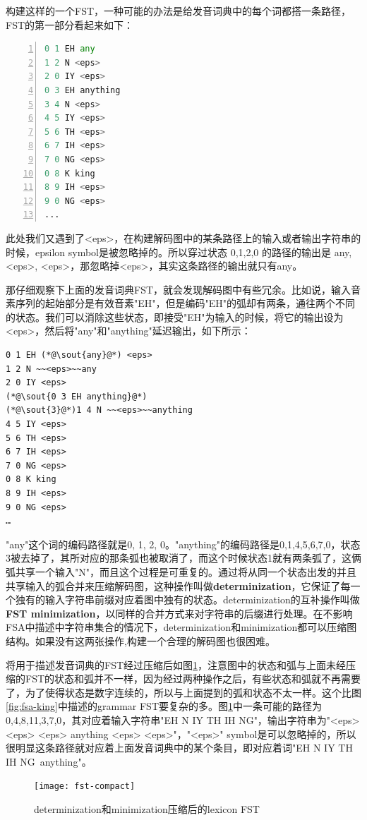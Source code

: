 构建这样的一个FST，一种可能的办法是给发音词典中的每个词都搭一条路径，FST的第一部分看起来如下：
\begin{lstlisting}[language = python, numbers=left, 
   numberstyle=\tiny,keywordstyle=\color{blue!70},
   commentstyle=\color{red!50!green!50!blue!50},frame=shadowbox,
   rulesepcolor=\color{red!20!green!20!blue!20},basicstyle=\ttfamily]
0 1 EH any
1 2 N <eps>
2 0 IY <eps>
0 3 EH anything
3 4 N <eps>
4 5 IY <eps>
5 6 TH <eps>
6 7 IH <eps>
7 0 NG <eps>
0 8 K king
8 9 IH <eps>
9 0 NG <eps>
...
\end{lstlisting}

此处我们又遇到了<eps>，在构建解码图中的某条路径上的输入或者输出字符串的时候，epsilon symbol是被忽略掉的。所以穿过状态 0,1,2,0 的路径的输出是 any, <eps>, <eps>，那忽略掉<eps>，其实这条路径的输出就只有any。

那仔细观察下上面的发音词典FST，就会发现解码图中有些冗余。比如说，输入音素序列的起始部分是有效音素"EH"，但是编码"EH"的弧却有两条，通往两个不同的状态。我们可以消除这些状态，即接受"EH"为输入的时候，将它的输出设为<eps>，然后将"any"和"anything"延迟输出，如下所示：
\begin{lstlisting}[style=A]
0 1 EH (*@\sout{any}@*) <eps>
1 2 N ~~<eps>~~any
2 0 IY <eps>
(*@\sout{0 3 EH anything}@*)
(*@\sout{3}@*)1 4 N ~~<eps>~~anything
4 5 IY <eps>
5 6 TH <eps>
6 7 IH <eps>
7 0 NG <eps>
0 8 K king
8 9 IH <eps>
9 0 NG <eps>
…
\end{lstlisting}

"any"这个词的编码路径就是0, 1, 2, 0。"anything"的编码路径是0,1,4,5,6,7,0，状态3被去掉了，其所对应的那条弧也被取消了，而这个时候状态1就有两条弧了，这俩弧共享一个输入"N"，而且这个过程是可重复的。通过将从同一个状态出发的并且共享输入的弧合并来压缩解码图，这种操作叫做{\bf determinization}，它保证了每一个独有的输入字符串前缀对应着图中独有的状态。determinization的互补操作叫做{\bf FST minimization}，以同样的合并方式来对字符串的后缀进行处理。在不影响FSA中描述中字符串集合的情况下，determinization和minimization都可以压缩图结构。如果没有这两张操作,构建一个合理的解码图也很困难。

将用于描述发音词典的FST经过压缩后如图\ref{fig:fst-compact}，注意图中的状态和弧与上面未经压缩的FST的状态和弧并不一样，因为经过两种操作之后，有些状态和弧就不再需要了，为了使得状态是数字连续的，所以与上面提到的弧和状态不太一样。这个比图\ref{fig:fsa-king}中描述的grammar FST要复杂的多。图\ref{fig:fst-compact}中一条可能的路径为 0,4,8,11,3,7,0，其对应着输入字符串"EH N IY TH IH NG"，输出字符串为"<eps> <eps> <eps> anything <eps> <eps>"，"<eps>" symbol是可以忽略掉的，所以很明显这条路径就对应着上面发音词典中的某个条目，即对应着词"EH N IY TH IH NG\ anything"。
\begin{figure}[htbp]
  \centering
  \texttt{[image: fst-compact]}
  \caption{determinization和minimization压缩后的lexicon FST \label{fig:fst-compact}}
\end{figure}


